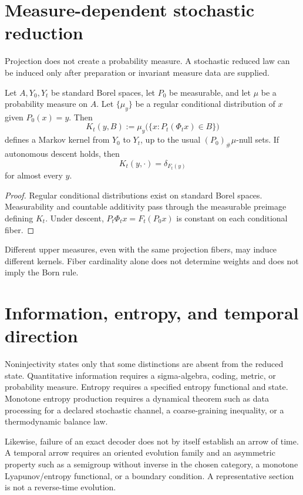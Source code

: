 \documentclass[11pt]{article}
\begin{document}
\section{Measure-dependent stochastic reduction}

Projection does not create a probability measure. A stochastic reduced law
can be induced only after preparation or invariant measure data are supplied.

\begin{theorem}\label{thm:kernel}
Let $A,Y_0,Y_t$ be standard Borel spaces, let $P_0$ be measurable, and let
$\mu$ be a probability measure on $A$. Let $\{\mu_y\}$ be a regular
conditional distribution of $x$ given $P_0(x)=y$. Then
\[
 K_t(y,B)
 :=\mu_y\bigl(\{x:P_t(\Phi_tx)\in B\}\bigr)
\]
defines a Markov kernel from $Y_0$ to $Y_t$, up to the usual
$(P_0)_\#\mu$-null sets. If autonomous descent holds, then
\[
 K_t(y,\cdot)=\delta_{F_t(y)}
\]
for almost every $y$.
\end{theorem}

\begin{proof}
Regular conditional distributions exist on standard Borel spaces. Measurability
and countable additivity pass through the measurable preimage defining $K_t$.
Under descent, $P_t\Phi_tx=F_t(P_0x)$ is constant on each conditional fiber.
\end{proof}

Different upper measures, even with the same projection fibers, may induce
different kernels. Fiber cardinality alone does not determine weights and does
not imply the Born rule.

\section{Information, entropy, and temporal direction}

Noninjectivity states only that some distinctions are absent from the reduced
state. Quantitative information requires a sigma-algebra, coding, metric, or
probability measure. Entropy requires a specified entropy functional and
state. Monotone entropy production requires a dynamical theorem such as data
processing for a declared stochastic channel, a coarse-graining inequality,
or a thermodynamic balance law.

Likewise, failure of an exact decoder does not by itself establish an arrow of
time. A temporal arrow requires an oriented evolution family and an asymmetric
property such as a semigroup without inverse in the chosen category, a
monotone Lyapunov/entropy functional, or a boundary condition. A
representative section is not a reverse-time evolution.
\end{document}
